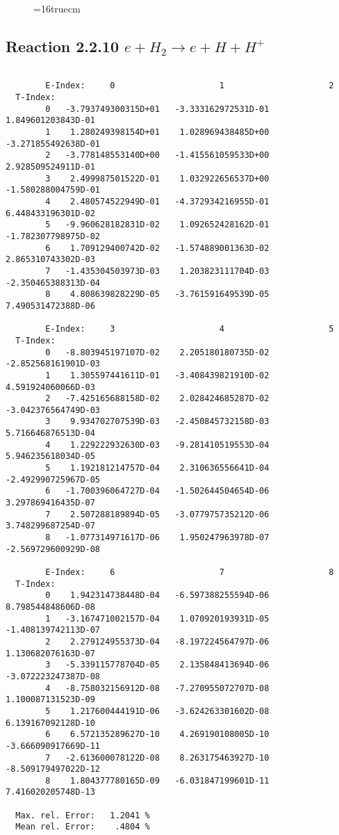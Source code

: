 \documentclass[12pt]{article}
\begin{document}
\begin{figure} \label{2.2.9}
\epsfxsize=16truecm
\end{figure}
\newpage

\subsection{
Reaction 2.2.10  $ e + H_2  \rightarrow e + H + H^+  $
}

\begin{small}\begin{verbatim}

        E-Index:     0                     1                     2
  T-Index:
        0   -3.793749300315D+01   -3.333162972531D-01    1.849601203843D-01
        1    1.280249398154D+01    1.028969438485D+00   -3.271855492638D-01
        2   -3.778148553140D+00   -1.415561059533D+00    2.928509524911D-01
        3    2.499987501522D-01    1.032922656537D+00   -1.580288004759D-01
        4    2.480574522949D-01   -4.372934216955D-01    6.448433196301D-02
        5   -9.960628182831D-02    1.092652428162D-01   -1.782307798975D-02
        6    1.709129400742D-02   -1.574889001363D-02    2.865310743302D-03
        7   -1.435304503973D-03    1.203823111704D-03   -2.350465388313D-04
        8    4.808639828229D-05   -3.761591649539D-05    7.490531472388D-06

        E-Index:     3                     4                     5
  T-Index:
        0   -8.803945197107D-02    2.205180180735D-02   -2.852568161901D-03
        1    1.305597441611D-01   -3.408439821910D-02    4.591924060066D-03
        2   -7.425165688158D-02    2.028424685287D-02   -3.042376564749D-03
        3    9.934702707539D-03   -2.450845732158D-03    5.716646876513D-04
        4    1.229222932630D-03   -9.281410519553D-04    5.946235618034D-05
        5    1.192181214757D-04    2.310636556641D-04   -2.492990725967D-05
        6   -1.700396064727D-04   -1.502644504654D-06    3.297869416435D-07
        7    2.507288189894D-05   -3.077975735212D-06    3.748299687254D-07
        8   -1.077314971617D-06    1.950247963978D-07   -2.569729600929D-08

        E-Index:     6                     7                     8
  T-Index:
        0    1.942314738448D-04   -6.597388255594D-06    8.798544848606D-08
        1   -3.167471002157D-04    1.070920193931D-05   -1.408139742113D-07
        2    2.279124955373D-04   -8.197224564797D-06    1.130682076163D-07
        3   -5.339115778704D-05    2.135848413694D-06   -3.072223247387D-08
        4   -8.758032156912D-08   -7.270955072707D-08    1.100087131523D-09
        5    1.217600444191D-06   -3.624263301602D-08    6.139167092128D-10
        6    6.572135289627D-10    4.269190108005D-10   -3.666090917669D-11
        7   -2.613600078122D-08    8.263175463927D-10   -8.509179497022D-12
        8    1.804377780165D-09   -6.031847199601D-11    7.416020205748D-13

  Max. rel. Error:   1.2041 %
  Mean rel. Error:    .4804 %
\end{verbatim}\end{small}
\end{document}
